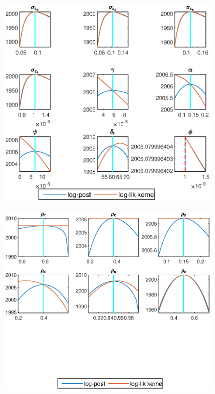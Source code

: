 \documentclass[11pt,preprint, authoryear]{elsarticle}
\let\origfigure\figure
\let\endorigfigure\endfigure
\renewenvironment{figure}[1][2] {
    \expandafter\origfigure\expandafter[H]
} {
    \endorigfigure
}
\numberwithin{equation}{section}
\numberwithin{figure}{section}
\numberwithin{table}{section}
\begin{document}
\begin{figure}
     \centering
     \begin{subfigure}[H]{0.49\textwidth}
         \centering
         \includegraphics[width=\textwidth]{code/mode_check_1_money}
     \end{subfigure}
     \begin{subfigure}[H]{0.49\textwidth}
         \centering
         \includegraphics[width=\textwidth]{code/mode_check_2_money}
     \end{subfigure}
        \caption{Estimated structural parameters mode check plots for extended sample under flexible money growth rule (\ref{s2}). The difference in the shapes of the likelihood kernel (red line) and the posterior likelihood (blue line) indicates the role of the prior in influencing the curvature of the likelihood function.}
        \label{mc3}
\end{figure}
\end{document}
